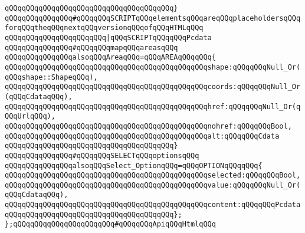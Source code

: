 \verb|qQQqqQQqqQQqqQQqqQQqqQQqqQQqqQQqqQQqqQQq}|\newline
\verb|qQQqqQQqqQQqqQQq#qQQqqQQqSCRIPTqQQqelementsqQQqareqQQqplaceholdersqQQqforqQQqtheqQQqnextqQQqversionqQQqofqQQqHTMLqQQq|\newline
\verb|qQQqqQQqqQQqqQQqqQQqqQQq|\verb#|qQQqSCRIPTqQQqqQQqPcdata#\newline
\newline
\verb|qQQqqQQqqQQqqQQq#qQQqqQQqmapqQQqareasqQQq|\newline
\verb|qQQqqQQqqQQqqQQqalsoqQQqAreaqQQq=qQQqAREAqQQqqQQq{|\newline
\verb|qQQqqQQqqQQqqQQqqQQqqQQqqQQqqQQqqQQqqQQqqQQqqQQqshape:qQQqqQQqNull_Or(qQQqshape::ShapeqQQq),|\newline
\verb|qQQqqQQqqQQqqQQqqQQqqQQqqQQqqQQqqQQqqQQqqQQqqQQqcoords:qQQqqQQqNull_Or(qQQqCdataqQQq),|\newline
\verb|qQQqqQQqqQQqqQQqqQQqqQQqqQQqqQQqqQQqqQQqqQQqqQQqhref:qQQqqQQqNull_Or(qQQqUrlqQQq),|\newline
\verb|qQQqqQQqqQQqqQQqqQQqqQQqqQQqqQQqqQQqqQQqqQQqqQQqnohref:qQQqqQQqBool,|\newline
\verb|qQQqqQQqqQQqqQQqqQQqqQQqqQQqqQQqqQQqqQQqqQQqqQQqalt:qQQqqQQqCdata|\newline
\verb|qQQqqQQqqQQqqQQqqQQqqQQqqQQqqQQqqQQqqQQq}|\newline
\newline
\verb|qQQqqQQqqQQqqQQq#qQQqqQQqSELECTqQQqoptionsqQQq|\newline
\verb|qQQqqQQqqQQqqQQqalsoqQQqSelect_OptionqQQq=qQQqOPTIONqQQqqQQq{|\newline
\verb|qQQqqQQqqQQqqQQqqQQqqQQqqQQqqQQqqQQqqQQqqQQqqQQqselected:qQQqqQQqBool,|\newline
\verb|qQQqqQQqqQQqqQQqqQQqqQQqqQQqqQQqqQQqqQQqqQQqqQQqvalue:qQQqqQQqNull_Or(qQQqCdataqQQq),|\newline
\verb|qQQqqQQqqQQqqQQqqQQqqQQqqQQqqQQqqQQqqQQqqQQqqQQqcontent:qQQqqQQqPcdata|\newline
\verb|qQQqqQQqqQQqqQQqqQQqqQQqqQQqqQQqqQQqqQQq};|\newline
\newline
\verb|};qQQqqQQqqQQqqQQqqQQqqQQq#qQQqqQQqApiqQQqHtmlqQQq|\newline
\newline
\newline

